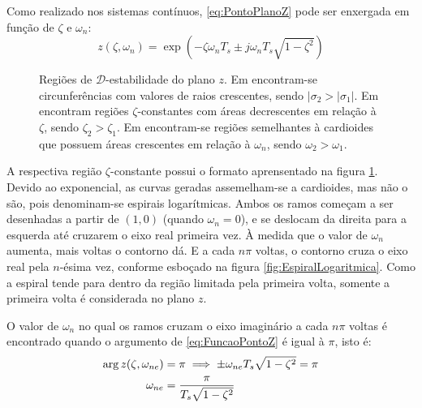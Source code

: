Como realizado nos sistemas contínuos, \eqref{eq:PontoPlanoZ} pode ser enxergada em função de $\zeta$ e $\omega_n$:
\begin{equation}
  z(\zeta,\omega_n) = \exp{\left(-\zeta\omega_nT_s \pm j\omega_nT_s\sqrt{1-\zeta^2}\right)}\label{eq:FuncaoPontoZ}
\end{equation}
\begin{figure}[!ht]
  \centering
  \begin{subfigure}[t]{0.3\columnwidth}
      
      \caption{}
      \label{subfig:EstabilidadeRelativaZ}
  \end{subfigure}
  \begin{subfigure}[t]{0.3\columnwidth}
      
      \caption{}
      \label{subfig:TaxaDeAmortecimentoZ}
  \end{subfigure}
  \begin{subfigure}[t]{0.3\columnwidth}
    
    \caption{}
    \label{subfig:OscilacaoNaoAmortecidaZ}
  \end{subfigure}
  \caption{Regiões de $\mathscr{D}$-estabilidade do plano $z$. Em  encontram-se circunferências com valores de raios crescentes, sendo $|\sigma_2 > |\sigma_1|$. Em  encontram regiões $\zeta$-constantes com áreas decrescentes em relação à $\zeta$, sendo $\zeta_2 > \zeta_1$. Em  encontram-se regiões semelhantes à cardioides que possuem áreas crescentes em relação à $\omega_n$, sendo $\omega_2 > \omega_1$.}
  \label{fig:RegioesPlanoZ}
\end{figure}

A respectiva região $\zeta$-constante possui o formato aprensentado na figura \ref{subfig:EstabilidadeRelativaZ}. Devido ao exponencial, as curvas geradas assemelham-se a cardioides, mas não o são, pois denominam-se espirais logarítmicas. Ambos os ramos começam a ser desenhadas a partir de $(1,0)$ (quando $\omega_n = 0$), e se deslocam da direita para a esquerda até cruzarem o eixo real primeira vez. À medida que o valor de $\omega_n$ aumenta, mais voltas o contorno dá. E a cada $n\pi$ voltas, o contorno cruza o eixo real pela $n$-ésima vez, conforme esboçado na figura \ref{fig:EspiralLogaritmica}. Como a espiral tende para dentro da região limitada pela primeira volta, somente a primeira volta é considerada no plano $z$.

O valor de $\omega_n$ no qual os ramos cruzam o eixo imaginário a cada $n\pi$ voltas é encontrado quando o argumento de \eqref{eq:FuncaoPontoZ} é igual à $\pi$, isto é:
\begin{align}
  \arg{z(\zeta,\omega_{ne})} &= \pi \implies \pm \omega_{ne}T_s\sqrt{1-\zeta^2} = \pi\notag\\
  \omega_{ne} &= \dfrac{\pi}{T_s\sqrt{1-\zeta^2}}\label{eq:PontoExtremoZetaZ}
\end{align}

